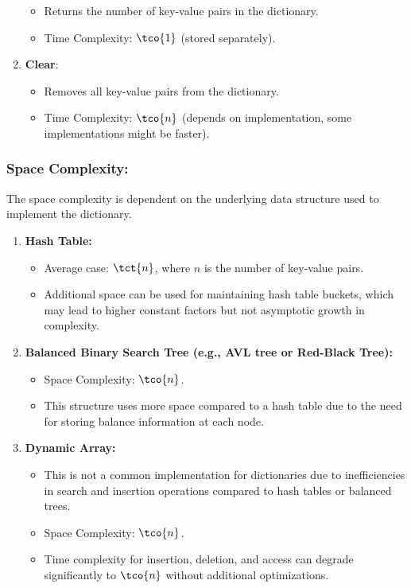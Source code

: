 \begin{enumerate}
          \begin{itemize}
              \item Returns the number of key-value pairs in the dictionary.
              \item Time Complexity: $\tco{1}$ (stored separately).
          \end{itemize}
    \item \textbf{Clear}:
          \begin{itemize}
              \item Removes all key-value pairs from the dictionary.
              \item Time Complexity: $\tco{n}$ (depends on implementation, some implementations might be faster).
          \end{itemize}
\end{enumerate}

\subsubsection{Space Complexity:}

The space complexity is dependent on the underlying data structure used
to implement the dictionary.

\begin{enumerate}
    \item \textbf{Hash Table:}
          \begin{itemize}
              \item Average case: $\tct{n}$, where $n$ is the number of key-value pairs.
              \item Additional space can be used for maintaining hash table buckets, which may lead to higher constant factors but not asymptotic growth in complexity.
          \end{itemize}
    \item \textbf{Balanced Binary Search Tree (e.g., AVL tree or Red-Black Tree):}
          \begin{itemize}
              \item Space Complexity: $\tco{n}$.
              \item This structure uses more space compared to a hash table due to the need for storing balance information at each node.
          \end{itemize}
    \item \textbf{Dynamic Array:}
          \begin{itemize}
              \item This is not a common implementation for dictionaries due to inefficiencies in search and insertion operations compared to hash tables or balanced trees.
              \item Space Complexity: $\tco{n}$.
              \item Time complexity for insertion, deletion, and access can degrade significantly to $\tco{n}$ without additional optimizations.
          \end{itemize}
\end{enumerate}


